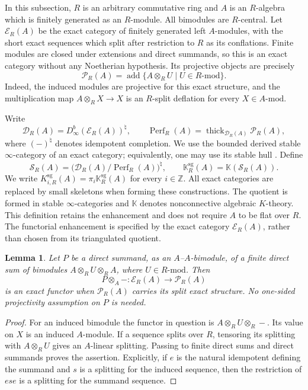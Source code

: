 \documentclass[12pt,a4paper,english,reqno]{amsart}
\numberwithin{equation}{section}
\theoremstyle{plain}
\newtheorem{lemma}[theorem]{Lemma}
\theoremstyle{definition}
\begin{document}
In this subsection, $R$ is an arbitrary commutative ring and $A$ is an
$R$-algebra which is finitely generated as an $R$-module. All bimodules
are $R$-central. Let $\mathcal E_R(A)$ be the exact category of finitely
generated left $A$-modules, with the short exact sequences which split
after restriction to $R$ as its conflations. Finite modules are
closed under extensions and direct summands, so this is an exact
category without any Noetherian hypothesis. Its projective objects
are precisely
\[
 \mathcal P_R(A)=\operatorname{add}
 \{A\otimes_R U\mid U\in R\text{-}\mathrm{mod}\}.
\]
Indeed, the induced modules are projective for this exact structure,
and the multiplication map $A\otimes_R X\longrightarrow X$ is an
$R$-split deflation for every $X\in A\text{-}\mathrm{mod}$.

Write
\[
 \mathcal D_R(A)=D^b_\infty(\mathcal E_R(A))^{\natural},\qquad
 \operatorname{Perf}_R(A)
 =\operatorname{thick}_{\mathcal D_R(A)}\mathcal P_R(A),
\]
where $(-)^{\natural}$ denotes idempotent completion. We use the
bounded derived stable $\infty$-category of an exact category; equivalently,
one may use its stable hull \cite[Theorem~1.2 and equation~(1)]{Klemenc2022}.
Define
\[
 \mathcal S_R(A)=
 \bigl(\mathcal D_R(A)/\operatorname{Perf}_R(A)\bigr)^{\natural},
 \qquad
 \mathbb K^{\mathrm{sg}}_R(A)=\mathbb K(\mathcal S_R(A)).
\]
We write $K^{\mathrm{sg}}_{i,R}(A)=\pi_i\mathbb K_R^{\mathrm{sg}}(A)$
for every $i\in\mathbb Z$. All exact categories are replaced by
small skeletons when forming these constructions.
The quotient is formed in stable $\infty$-categories and
$\mathbb K$ denotes nonconnective algebraic $K$-theory. This definition
retains the enhancement and does not require $A$ to be flat over $R$.
The functorial enhancement is specified by the exact category
$\mathcal E_R(A)$, rather than chosen from its triangulated quotient.

\begin{lemma}\label{lem:relative-error-exact}
Let $P$ be a direct summand, as an $A$--$A$-bimodule, of a finite direct
sum of bimodules $A\otimes_R U\otimes_R A$, where
$U\in R\text{-}\mathrm{mod}$. Then
\[
 P\otimes_A-:\mathcal E_R(A)\longrightarrow\mathcal P_R(A)
\]
is an exact functor when $\mathcal P_R(A)$ carries its split exact
structure. No one-sided projectivity assumption on $P$ is needed.
\end{lemma}

\begin{proof}
For an induced bimodule the functor in question is
$A\otimes_R U\otimes_R-$. Its value on $X$ is an induced
$A$-module. If a sequence splits over $R$, tensoring its splitting
with $A\otimes_R U$ gives an $A$-linear splitting. Passing to finite
direct sums and direct summands proves the assertion. Explicitly,
if $e$ is the natural idempotent defining the summand and $s$ is a
splitting for the induced sequence, then the restriction of $ese$
is a splitting for the summand sequence.
\end{proof}
\end{document}
